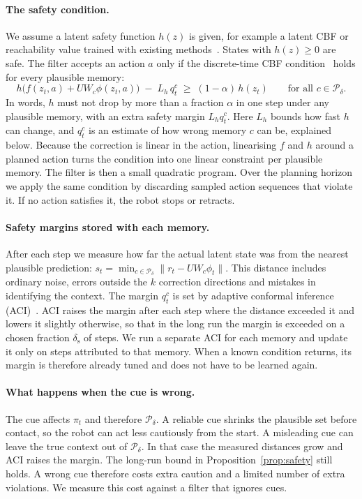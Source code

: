 \documentclass[10pt]{article}
\newcommand{\Pd}{\mathcal{P}_\delta}
\begin{document}
\paragraph{The safety condition.}
We assume a latent safety function $h(z)$ is given, for example a latent CBF or reachability value
trained with existing methods~\cite{nakamura2025latent,nakamura2026latentcbf}. States with $h(z)\ge 0$
are safe. The filter accepts an action $a$ only if the discrete-time CBF
condition~\cite{agrawal2017discrete} holds for every plausible memory:
\begin{equation}
  h\big(f(z_t,a)+UW_c\phi(z_t,a)\big)\;-\;L_h\,q^{c}_t\;\ge\;(1-\alpha)\,h(z_t)
  \qquad\text{for all } c\in\Pd .
  \label{eq:cbf}
\end{equation}
In words, $h$ must not drop by more than a fraction $\alpha$ in one step under any plausible memory,
with an extra safety margin $L_h q^c_t$. Here $L_h$ bounds how fast $h$ can change, and $q^c_t$ is an
estimate of how wrong memory $c$ can be, explained below. Because the correction is linear in the
action, linearising $f$ and $h$ around a planned action turns the condition into one linear constraint
per plausible memory. The filter is then a small quadratic program. Over the planning horizon we
apply the same condition by discarding sampled action sequences that violate it. If no action
satisfies it, the robot stops or retracts.

\paragraph{Safety margins stored with each memory.}
After each step we measure how far the actual latent state was from the nearest plausible prediction:
$s_t=\min_{c\in\Pd}\|r_t-UW_c\phi_t\|$. This distance includes ordinary noise, errors outside the $k$
correction directions and mistakes in identifying the context. The margin $q^c_t$ is set by adaptive
conformal inference (ACI)~\cite{gibbs2021adaptive}. ACI raises the margin after each step where the
distance exceeded it and lowers it slightly otherwise, so that in the long run the margin is exceeded
on a chosen fraction $\delta_{\mathrm s}$ of steps. We run a separate ACI for each memory and update it
only on steps attributed to that memory. When a known condition returns, its margin is therefore
already tuned and does not have to be learned again.

\paragraph{What happens when the cue is wrong.}
The cue affects $\pi_t$ and therefore $\Pd$. A reliable cue shrinks the plausible set before contact,
so the robot can act less cautiously from the start. A misleading cue can leave the true context out
of $\Pd$. In that case the measured distances grow and ACI raises the margin. The long-run bound in
Proposition~\ref{prop:safety} still holds. A wrong cue therefore costs extra caution and a limited
number of extra violations. We measure this cost against a filter that ignores cues.
\end{document}
